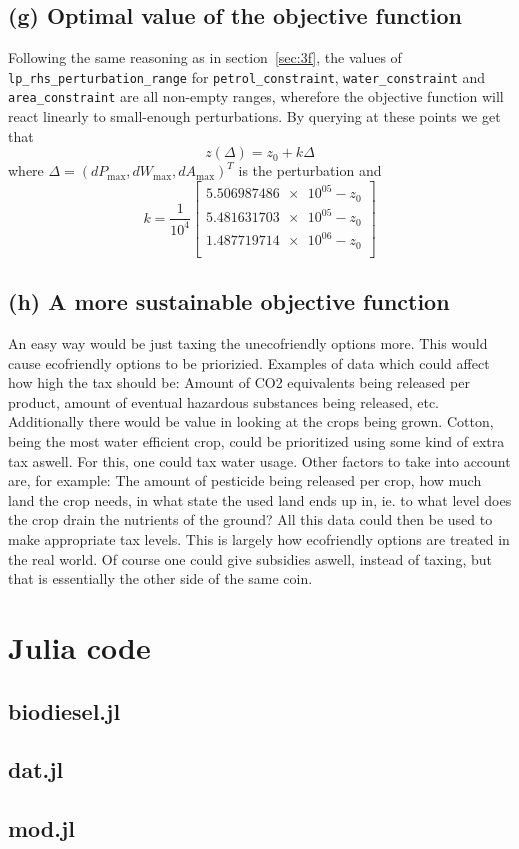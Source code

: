 \documentclass{article}
\begin{document}
\subsection{(g) Optimal value of the objective function}
Following the same reasoning as in section~\ref{sec:3f},
the values of \verb+lp_rhs_perturbation_range+ for
\verb+petrol_constraint+, \verb+water_constraint+ and \verb+area_constraint+
are all non-empty ranges,
wherefore the objective function will react linearly to small-enough perturbations.
By querying at these points we get that
$$ z(\Delta) = z_0 + k \Delta $$
where $\Delta = (dP_\text{max}, dW_\text{max}, dA_\text{max})^T$ is the perturbation
and
$$ k = \frac1{10^4} \left[ \begin{array}{l}
	\num{5.506987486e+05} - z_0 \\
	\num{5.481631703e+05} - z_0 \\
	\num{1.487719714e+06} - z_0 \\
\end{array}\right]$$

\subsection{(h) A more sustainable objective function}
An easy way would be just taxing the unecofriendly options more. 
This would cause ecofriendly options to be priorizied. 
Examples of data which could affect how high the tax should be:
Amount of CO2 equivalents being released per product, amount of eventual hazardous substances being released, etc. 
Additionally there would be value in looking at the crops being grown. 
Cotton, being the most water efficient crop, could be prioritized using some kind of extra tax aswell.
For this, one could tax water usage. 
Other factors to take into account are, for example: 
The amount of pesticide being released per crop, how much land the crop needs, in what state the used land ends up in, 
ie. to what level does the crop drain the nutrients of the ground?
All this data could then be used to make appropriate tax levels.  
This is largely how ecofriendly options are treated in the real world.  
Of course one could give subsidies aswell, instead of taxing, but that is essentially the other side of the same coin. 

\appendix
\section{Julia code}\label{app:code}
\subsection{biodiesel.jl}

\subsection{dat.jl}

\subsection{mod.jl}

\end{document}

